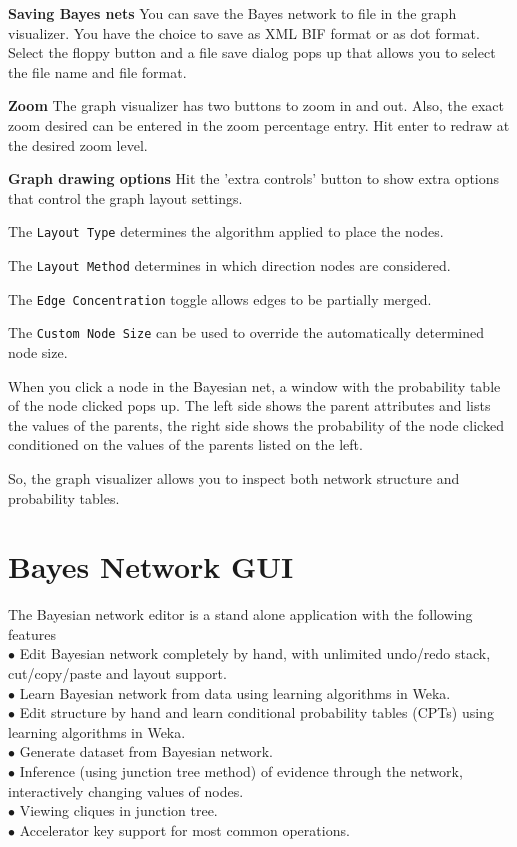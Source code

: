 \documentclass[a4paper]{article}
\begin{document}
{\bf Saving Bayes nets} You can save the Bayes network to file in the graph visualizer.
You have the choice to save as XML BIF format or as dot format. Select the floppy button
and a file save dialog pops up that allows you to select the file name and file format.

{\bf Zoom} The graph visualizer has two buttons to zoom in and out. Also, the exact zoom
desired can be entered in the zoom percentage entry. Hit enter to redraw at the desired zoom
level.

{\bf Graph drawing options} Hit the 'extra controls' button to show extra options that
control the graph layout settings.

\begin{center}
\end{center}

The {\tt Layout Type} determines the algorithm applied to place the nodes.

The {\tt Layout Method} determines in which direction nodes are considered.

The {\tt Edge Concentration} toggle allows edges to be partially merged.

The {\tt Custom Node Size} can be used to override the automatically determined node size.

When you click a node in the Bayesian net, a window with the probability table of the node 
clicked pops up. The left side shows the parent attributes and lists the values of the
parents, the right side shows the probability of the node clicked conditioned on the 
values of the parents listed on the left.

\begin{center}
\end{center}

So, the graph visualizer allows you to inspect both network structure and probability tables. 

\section{Bayes Network GUI}

The Bayesian network editor is a stand alone application with the following features\\
$\bullet$ Edit Bayesian network completely by hand, with unlimited undo/redo stack,
cut/copy/paste and layout support.\\
$\bullet$ Learn Bayesian network from data using learning algorithms in Weka.\\
$\bullet$ Edit structure by hand and learn conditional probability tables (CPTs) using learning algorithms in Weka.\\
$\bullet$ Generate dataset from Bayesian network.\\
$\bullet$ Inference (using junction tree method) of evidence through the network,
interactively changing values of nodes.\\
$\bullet$ Viewing cliques in junction tree.\\
$\bullet$ Accelerator key support for most common operations.\\
\end{document}
